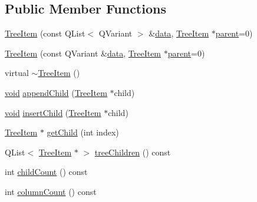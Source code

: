\subsection*{\-Public \-Member \-Functions}
\begin{DoxyCompactItemize}
\item 
\hyperlink{group___u_a_v_object_browser_plugin_gaee288dea1233cde85e888cd709a5385e}{\-Tree\-Item} (const \-Q\-List$<$ \-Q\-Variant $>$ \&\hyperlink{group___u_a_v_object_browser_plugin_ga7c5708ae3cbba9c509f497c493beccb6}{data}, \hyperlink{class_tree_item}{\-Tree\-Item} $\ast$\hyperlink{group___u_a_v_object_browser_plugin_gaa3a7ba624312b6be70872634db291881}{parent}=0)
\item 
\hyperlink{group___u_a_v_object_browser_plugin_ga18da596c178ccc1c830ac82d1896be1d}{\-Tree\-Item} (const \-Q\-Variant \&\hyperlink{group___u_a_v_object_browser_plugin_ga7c5708ae3cbba9c509f497c493beccb6}{data}, \hyperlink{class_tree_item}{\-Tree\-Item} $\ast$\hyperlink{group___u_a_v_object_browser_plugin_gaa3a7ba624312b6be70872634db291881}{parent}=0)
\item 
virtual \hyperlink{group___u_a_v_object_browser_plugin_ga859429185d908c3e54861bbbfb185425}{$\sim$\-Tree\-Item} ()
\item 
\hyperlink{group___u_a_v_objects_plugin_ga444cf2ff3f0ecbe028adce838d373f5c}{void} \hyperlink{group___u_a_v_object_browser_plugin_gac7f432ac0587ca037e80857eefd622f8}{append\-Child} (\hyperlink{class_tree_item}{\-Tree\-Item} $\ast$child)
\item 
\hyperlink{group___u_a_v_objects_plugin_ga444cf2ff3f0ecbe028adce838d373f5c}{void} \hyperlink{group___u_a_v_object_browser_plugin_ga1d0b952f15a93167dadb41667ccc5e4c}{insert\-Child} (\hyperlink{class_tree_item}{\-Tree\-Item} $\ast$child)
\item 
\hyperlink{class_tree_item}{\-Tree\-Item} $\ast$ \hyperlink{group___u_a_v_object_browser_plugin_gae115cb3e046c94117d64ee87764cb3ef}{get\-Child} (int index)
\item 
\-Q\-List$<$ \hyperlink{class_tree_item}{\-Tree\-Item} $\ast$ $>$ \hyperlink{group___u_a_v_object_browser_plugin_gaa56dc80d617c2c9bd914abe5da774fd8}{tree\-Children} () const 
\item 
int \hyperlink{group___u_a_v_object_browser_plugin_ga55ffe6dd27750e479034b93e753f87af}{child\-Count} () const 
\item 
int \hyperlink{group___u_a_v_object_browser_plugin_ga31c3fb89ad8e19ae696a310a1f843a8e}{column\-Count} () const 
\item 

\end{DoxyCompactItemize}
